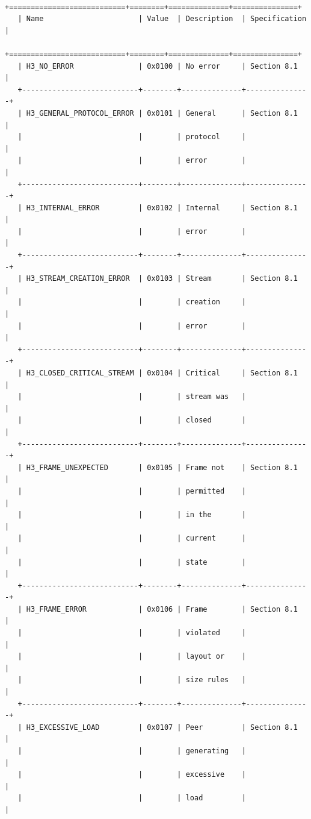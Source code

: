 \documentclass{article}
\begin{document}
\begin{verbatim}
   +===========================+========+==============+===============+
   | Name                      | Value  | Description  | Specification |
   +===========================+========+==============+===============+
   | H3_NO_ERROR               | 0x0100 | No error     | Section 8.1   |
   +---------------------------+--------+--------------+---------------+
   | H3_GENERAL_PROTOCOL_ERROR | 0x0101 | General      | Section 8.1   |
   |                           |        | protocol     |               |
   |                           |        | error        |               |
   +---------------------------+--------+--------------+---------------+
   | H3_INTERNAL_ERROR         | 0x0102 | Internal     | Section 8.1   |
   |                           |        | error        |               |
   +---------------------------+--------+--------------+---------------+
   | H3_STREAM_CREATION_ERROR  | 0x0103 | Stream       | Section 8.1   |
   |                           |        | creation     |               |
   |                           |        | error        |               |
   +---------------------------+--------+--------------+---------------+
   | H3_CLOSED_CRITICAL_STREAM | 0x0104 | Critical     | Section 8.1   |
   |                           |        | stream was   |               |
   |                           |        | closed       |               |
   +---------------------------+--------+--------------+---------------+
   | H3_FRAME_UNEXPECTED       | 0x0105 | Frame not    | Section 8.1   |
   |                           |        | permitted    |               |
   |                           |        | in the       |               |
   |                           |        | current      |               |
   |                           |        | state        |               |
   +---------------------------+--------+--------------+---------------+
   | H3_FRAME_ERROR            | 0x0106 | Frame        | Section 8.1   |
   |                           |        | violated     |               |
   |                           |        | layout or    |               |
   |                           |        | size rules   |               |
   +---------------------------+--------+--------------+---------------+
   | H3_EXCESSIVE_LOAD         | 0x0107 | Peer         | Section 8.1   |
   |                           |        | generating   |               |
   |                           |        | excessive    |               |
   |                           |        | load         |               |

\end{verbatim}
\end{document}
